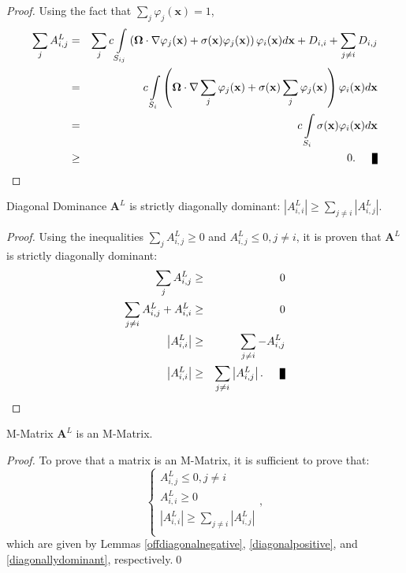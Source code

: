 \begin{proof}
Using the fact that $\sum\limits_j\varphi_j(\mathbf{x})=1$,
\begin{eqnarray*}
	\sum\limits_j A^L_{i,j} & = & \sum\limits_j c\int\limits_{S_{ij}}
      \left(\mathbf{\Omega}\cdot\nabla\varphi_j(\mathbf{x}) +
		\sigma(\mathbf{x})\varphi_j(\mathbf{x})\right)\varphi_i(\mathbf{x}) d\mathbf{x} +
		D_{i,i} + \sum\limits_{j\neq i}D_{i,j}\\
		& = & c\int\limits_{S_{i}}\left(\mathbf{\Omega}\cdot
         \nabla\sum\limits_j\varphi_j(\mathbf{x}) +
         \sigma(\mathbf{x})\sum\limits_j\varphi_j(\mathbf{x})\right)
         \varphi_i(\mathbf{x}) d\mathbf{x}\\
		\label{rowsum} & = & c\int\limits_{S_{i}}\sigma(\mathbf{x})
         \varphi_i(\mathbf{x}) d\mathbf{x}\\
		&\ge& 0.\qed
\end{eqnarray*}
\end{proof}
\begin{lemma}[label={diagonallydominant}]{Diagonal Dominance}
   $\mathbf{A}^L$ is strictly diagonally dominant:
   $\left|A^L_{i,i}\right| \ge \sum\limits_{j\ne i} \left|A^L_{i,j}\right|$.
\end{lemma}
\begin{proof}
Using the inequalities $\sum\limits_j A^L_{i,j} \ge 0$ and $A^L_{i,j}\le 0, j\ne i$,
it is proven that $\mathbf{A}^L$ is strictly diagonally dominant:
\begin{eqnarray*}
	\sum\limits_j A^L_{i,j} & \ge & 0\\
	\sum\limits_{j\ne i} A^L_{i,j} + A^L_{i,i} & \ge & 0\\
	\left|A^L_{i,i}\right| & \ge & \sum\limits_{j\ne i} -A^L_{i,j}\\
	\left|A^L_{i,i}\right| & \ge & \sum\limits_{j\ne i} \left|A^L_{i,j}\right|.\qed
\end{eqnarray*}
\end{proof}
\begin{lemma}{M-Matrix}
   $\mathbf{A}^L$ is an M-Matrix.
\end{lemma}
\begin{proof}
To prove that a matrix is an M-Matrix, it is sufficient to prove that:
\[
\left\{\begin{array}{l}
A^L_{i,j}\le 0, j\ne i\\
A^L_{i,i}\ge 0\\
\left|A^L_{i,i}\right| \ge \sum\limits_{j\ne i} \left|A^L_{i,j}\right|\\
\end{array}
\right.,
\]
which are given by Lemmas \ref{offdiagonalnegative}, \ref{diagonalpositive}, and
\ref{diagonallydominant}, respectively.\qed
\end{proof}

